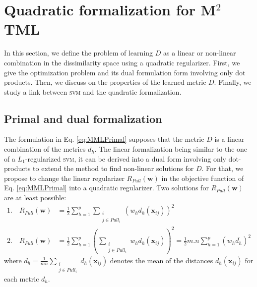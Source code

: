 \section{Quadratic formalization for M$^2$TML}
In this section, we define the problem of learning $D$ as a linear or non-linear combination in the dissimilarity space using a quadratic regularizer. First, we give the optimization problem and its dual formulation form involving only dot products. Then, we discuss on the properties of the learned metric $D$. Finally, we study a link between \textsc{svm} and the quadratic formalization. \\

\subsection{Primal and dual formalization}
The formulation in Eq. \ref{eq:MMLPrimal} supposes that the metric $D$ is a linear combination of the metrics $d_h$. The linear formalization being similar to the one of a $L_1$-regularized \textsc{svm}, it can be derived into a dual form involving only dot-products to extend the method to find non-linear solutions for $D$. For that, we propose to change the linear regularizer $R_{Pull}(\textbf{w})$ in the objective function of Eq. \ref{eq:MMLPrimal} into a quadratic regularizer. 
Two solutions for $R_{Pull}(\textbf{w})$ are at least possible:
\begin{align}
1. \quad R_{Pull}(\textbf{w})  & = \frac{1}{2} \sum\limits_{h=1}^{p} \sum\limits_{\substack{i \\ j \in Pull_i}} \left( w_h d_h(\textbf{x}_{ij})\right) ^2 \label{eq:regularizer1}\\
2. \quad R_{Pull}(\textbf{w}) 
& = \frac{1}{2} \sum\limits_{h=1}^{p} \left( \sum\limits_{\substack{i \\ j \in Pull_i}} w_h d_h(\textbf{x}_{ij})\right)^2 
= \frac{1}{2}m.n \sum\limits_{h=1}^{p} \left( w_h \bar{d_h} \right) ^2 \label{eq:regularizer2}
\end{align}
where $\bar{d_h} = \frac{1}{mn} \sum\limits_{\substack{i \\ j \in Pull_i}} d_h(\textbf{x}_{ij})$ denotes the mean of the distances $d_h(\textbf{x}_{ij})$ for each metric $d_h$. \\

